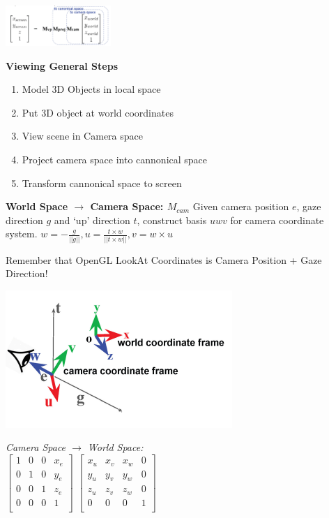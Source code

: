 \documentclass[letterpaper, 8pt]{extarticle}
\begin{document}
\begin{multicols*}{4}
\includegraphics[width=4cm]{cam-total.png}

\textbf{Viewing General Steps}
\begin{enumerate}
    \item Model 3D Objects in local space
    \item Put 3D object at world coordinates
    \item View scene in Camera space
    \item Project camera space into cannonical space
    \item Transform cannonical space to screen
\end{enumerate}

\textbf{World Space $\to$ Camera Space: $M_{cam}$}
Given camera position $e$, gaze direction $g$ and `up' direction $t$, construct basis $uwv$ for camera coordinate system.
$w = - \frac{g}{||g||}, u = \frac{t \times w}{||t \times w||}, v = w \times u$

Remember that OpenGL LookAt Coordinates is Camera Position + Gaze Direction!

\includegraphics[width=.5\linewidth]{camera-basis.png}

\textit{Camera Space $\to$ World Space:}\\
\(
\begin{bmatrix}
    1 & 0 & 0 & x_e \\
    0 & 1 & 0 & y_e \\
    0 & 0 & 1 & z_e \\
    0 & 0 & 0 & 1   \\
\end{bmatrix}
\)
\(
\begin{bmatrix}
    x_u & x_v & x_w & 0 \\
    y_u & y_v & y_w & 0 \\
    z_u & z_v & z_w & 0 \\
    0   & 0   & 0   & 1 \\
\end{bmatrix}
\)\\


\end{multicols*}
\end{document}
